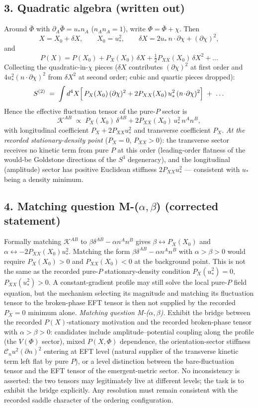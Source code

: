 \subsection*{3. Quadratic algebra (written out)}
Around $\bar\Phi$ with $\partial_A\bar\Phi=u_*n_A$
($n_An_A=1$), write $\Phi=\bar\Phi+\chi$.
Then
\[
X=X_0+\delta X,\qquad X_0=u_*^2,\qquad
\delta X=2u_*\,n\!\cdot\!\partial\chi+(\partial\chi)^2 ,
\]
and
\[
P(X)=P(X_0)+P_X(X_0)\,\delta X+\tfrac12P_{XX}(X_0)\,\delta X^2
+\dots
\]
Collecting the quadratic-in-$\chi$ pieces ($\delta X$ contributes
$(\partial\chi)^2$ at first order and $4u_*^2(n\!\cdot\!\partial
\chi)^2$ from $\delta X^2$ at second order; cubic and quartic
pieces dropped):
\[
S^{(2)}\;=\;\int d^4X\Bigl[\,P_X(X_0)\,(\partial\chi)^2
+2P_{XX}(X_0)\,u_*^2\,(n\!\cdot\!\partial\chi)^2\Bigr]
\;+\;\dots
\]
Hence the effective fluctuation tensor of the pure-$P$ sector is
\[
\mathcal K^{AB}\;\propto\;P_X(X_0)\,\delta^{AB}
+2P_{XX}(X_0)\,u_*^2\,n^An^B ,
\]
with longitudinal coefficient $P_X+2P_{XX}u_*^2$ and transverse
coefficient $P_X$.
\emph{At the recorded stationary-density point} ($P_X=0$,
$P_{XX}>0$): the transverse sector receives no kinetic term from
pure $P$ at this order (leading-order flatness of the would-be
Goldstone directions of the $S^3$ degeneracy), and the
longitudinal (amplitude) sector has positive Euclidean stiffness
$2P_{XX}u_*^2$ --- consistent with $u_*$ being a density minimum.

\subsection*{4. Matching question M-($\alpha,\beta$) (corrected
statement)}
Formally matching $\mathcal K^{AB}$ to
$\beta\delta^{AB}-\alpha n^An^B$ gives
$\beta\leftrightarrow P_X(X_0)$ and
$\alpha\leftrightarrow-2P_{XX}(X_0)u_*^2$.
Matching the form $\beta\delta^{AB}-\alpha n^An^B$ with
$\alpha>\beta>0$ would require $P_X(X_0)>0$ and
$P_{XX}(X_0)<0$ at the background point.
This is not the same as the recorded pure-$P$ stationary-density
condition $P_X(u_*^2)=0$, $P_{XX}(u_*^2)>0$.
A constant-gradient profile may still solve the local pure-$P$
field equation, but the mechanism selecting its magnitude and
matching its fluctuation tensor to the broken-phase EFT tensor is
then not supplied by the recorded $P_X=0$ minimum alone.
\emph{Matching question M-($\alpha,\beta$).}
Exhibit the bridge between the recorded $P(X)$-stationary
motivation and the recorded broken-phase tensor with
$\alpha>\beta>0$: candidates include amplitude--potential coupling
along the profile (the $V(\Phi)$ sector), mixed $P(X,\Phi)$
dependence, the orientation-sector stiffness
$\mathcal C_nu^2(\partial n)^2$ entering at EFT level (natural
supplier of the transverse kinetic term left flat by pure $P$), or
a level distinction between the bare-fluctuation tensor and the
EFT tensor of the emergent-metric sector.
No inconsistency is asserted: the two tensors may legitimately
live at different levels; the task is to exhibit the bridge
explicitly.
Any resolution must remain consistent with the recorded saddle
character of the ordering configuration.

